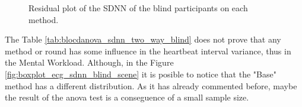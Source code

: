 \begin{figure}[!htb]
\begin{minipage}{0.45\textwidth}
        \caption{Residual plot of the SDNN of the blind participants on each method.}
        \label{fig:residplot_sdnn_two_way_blind}
    \end{minipage}
\end{figure}

%

The Table \ref{tab:blocdanova_sdnn_two_way_blind} does not prove that any method or round has some influence in the heartbeat interval variance, thus in the Mental Workload. Although, in the Figure \ref{fig:boxplot_ecg_sdnn_blind_scene} it is posible to notice that the "Base" method has a different distribution. As it has already commented before, maybe the result of the anova test is a conseguence of a small sample size.

\FloatBarrier